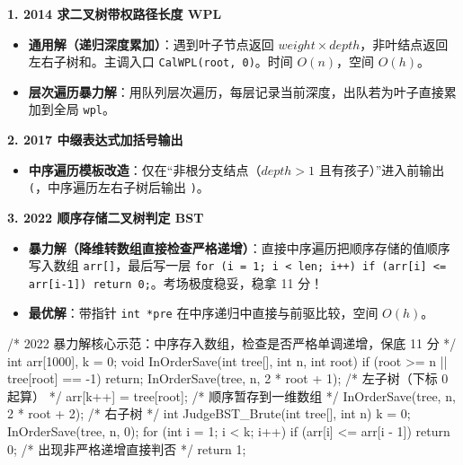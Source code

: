 \documentclass[10pt,a4paper]{ctexart}
\begin{document}
\par\addvspace{3pt}\par\addvspace{3pt}


\par\addvspace{2pt}\noindent\textbf{1. 2014 求二叉树带权路径长度 WPL}\par

\begin{itemize}

\item \textbf{通用解（递归深度累加）}：遇到叶子节点返回 $weight \times depth$，非叶结点返回左右子树和。主调入口 \texttt{CalWPL(root, 0)}。时间 $O(n)$，空间 $O(h)$。

\item \textbf{层次遍历暴力解}：用队列层次遍历，每层记录当前深度，出队若为叶子直接累加到全局 \texttt{wpl}。

\end{itemize}

\par\addvspace{2pt}\noindent\textbf{2. 2017 中缀表达式加括号输出}\par

\begin{itemize}

\item \textbf{中序遍历模板改造}：仅在“非根分支结点（$depth > 1$ 且有孩子）”进入前输出 \texttt{(}，中序遍历左右子树后输出 \texttt{)}。

\end{itemize}

\par\addvspace{2pt}\noindent\textbf{3. 2022 顺序存储二叉树判定 BST}\par

\begin{itemize}

\item \textbf{暴力解（降维转数组直接检查严格递增）}：直接中序遍历把顺序存储的值顺序写入数组 \texttt{arr[]}，最后写一层 \texttt{for (i = 1; i < len; i++) if (arr[i] <= arr[i-1]) return 0;}。考场极度稳妥，稳拿 11 分！

\item \textbf{最优解}：带指针 \texttt{int *pre} 在中序递归中直接与前驱比较，空间 $O(h)$。

\end{itemize}

\begin{codebox}
/* 2022 暴力解核心示范：中序存入数组，检查是否严格单调递增，保底 11 分 */
int arr[1000], k = 0;
void InOrderSave(int tree[], int n, int root) {
    if (root >= n || tree[root] == -1) return;
    InOrderSave(tree, n, 2 * root + 1); /* 左子树（下标 0 起算） */
    arr[k++] = tree[root];              /* 顺序暂存到一维数组 */
    InOrderSave(tree, n, 2 * root + 2); /* 右子树 */
}
int JudgeBST_Brute(int tree[], int n) {
    k = 0; InOrderSave(tree, n, 0);
    for (int i = 1; i < k; i++) {
        if (arr[i] <= arr[i - 1]) return 0; /* 出现非严格递增直接判否 */
    }
    return 1;
}
\end{codebox}
\end{document}
